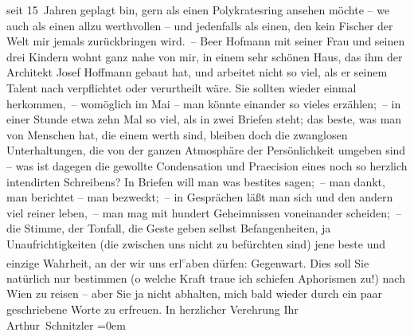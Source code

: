 \begin{ledgroupsized}[t]{13cm}
                    seit 15 Jahren geplagt bin, gern als einen Polykratesring ansehen möchte – we{\geminationn}{ }\strikeout{\textcolor{gray}{ich}} auch als einen allzu werthvollen – und jedenfalls als einen, den kein
                    Fischer der Welt mir jemals zurückbringen wird. –\pend
           \pstart
           {\pb}Beer Hofmann mit seiner Frau und seinen drei Kindern wohnt ganz nahe von
                    mir, in einem sehr schönen Haus, das ihm der Architekt Josef
                        Hoffmann gebaut hat, und arbeitet nicht so viel, als er seinem Talent
                    nach verpflichtet oder verurtheilt wäre. Sie sollten wieder einmal herkommen, –
                    womöglich im Mai – man könnte einander so vieles erzählen; – in einer Stunde
                    etwa zehn Mal so viel, als in zwei Briefen steht; das beste, was man von
                    Menschen hat, die einem werth sind, bleiben doch die zwanglosen Unterhaltungen,
                    die von der ganzen Atmosphäre der Persönlichkeit umgeben sind – was ist dagegen
                    die gewollte Condensation und Praecision eines noch so herzlich intendirten
                    Schreibens? {\pb}In Briefen will man was besti{\geminationm}tes sagen; – man dankt, man berichtet – man
                    bezweckt; – in Gesprächen läßt man sich und den andern viel reiner leben, – man
                    mag mit hundert Geheimnissen voneinander scheiden; – die Stimme, der Tonfall,
                    die Geste geben selbst Befangenheiten, ja Unaufrichtigkeiten (die zwischen uns
                    nicht zu befürchten sind) jene beste und einzige Wahrheit, an der wir uns erl\substVorne{}\textsuperscript{\textcolor{gray}{e}}\substDazwischen{}a\substHinten{}ben dürfen: Gegenwart.\pend
           \pstart
           Dies soll Sie natürlich nur bestimmen (o welche Kraft traue ich schiefen
                    Aphorismen zu!) nach Wien zu reisen – aber Sie
                    ja nicht abhalten, mich bald wieder durch ein paar geschriebene Worte zu
                    erfreuen. In herzlicher Verehrung\pend
           \pstart
           Ihr{\\[\baselineskip]}\spacefill\mbox{Arthur Schnitzler}\pend
           \leftskip=0em{}
         
         \endnumbering{}\end{ledgroupsized}  \newcommand{\dateiname}{L02000}\newcommand{\titel}{Arthur Schnitzler an Georg Brandes, 19. 1. 1911}\newcommand{\editorInnen}{Martin Anton Müller und Gerd-Hermann Susen}
      